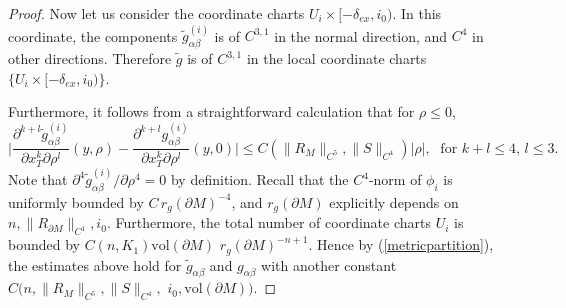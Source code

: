 \documentclass[11pt,letterpaper]{amsart}
\numberwithin{equation}{section}
\theoremstyle{definition}
\theoremstyle{plain}
\theoremstyle{definition}
\theoremstyle{plain}
\theoremstyle{definition}
\theoremstyle{plain}
\newcommand{\vol}{\textrm{vol}}
\begin{document}
\begin{proof}
Now let us consider the coordinate charts $U_i\times [-\delta_{ex},i_0)$. In this coordinate, the components $\widetilde{g}_{\alpha\beta}^{(i)}$ is of $C^{3,1}$ in the normal direction, and $C^4$ in other directions. Therefore $\widetilde{g}$ is of $C^{3,1}$ in the local coordinate charts $\{U_i\times [-\delta_{ex},i_0)\}$.

Furthermore, it follows from a straightforward calculation that for $\rho\leqslant 0$,
\begin{equation*}
\bigg|\frac{\partial^{k+l} \widetilde{g}^{(i)}_{\alpha\beta}}{\partial  x_T^k \partial \rho^l}(y,\rho)-\frac{\partial^{k+l} g^{(i)}_{\alpha\beta}}{\partial x_T^k \partial \rho^l}(y,0)\bigg|\leqslant C(\|R_M\|_{C^5},\|S\|_{C^4}) |\rho|, \;\textrm{ for }k+l\leqslant 4,\, l\leqslant 3.
\end{equation*}
Note that $\partial^4 \widetilde{g}^{(i)}_{\alpha\beta}/\partial \rho^4=0$ by definition. Recall that the $C^4$-norm of $\phi_i$ is uniformly bounded by $C\,r_g(\partial M)^{-4}$, and $r_g(\partial M)$ explicitly depends on $n,\|R_{\partial M}\|_{C^1},i_0$. Furthermore, the total number of coordinate charts $U_i$ is bounded by $C(n,K_1)\vol(\partial M)$ $r_g(\partial M)^{-n+1}$. Hence by (\ref{metricpartition}), the estimates above hold for $\widetilde{g}_{\alpha\beta}$ and $g_{\alpha\beta}$ with another constant $C(n,\|R_M\|_{C^5},\|S\|_{C^4},$ $i_0,\vol(\partial M))$.


\end{proof}
\end{document}
